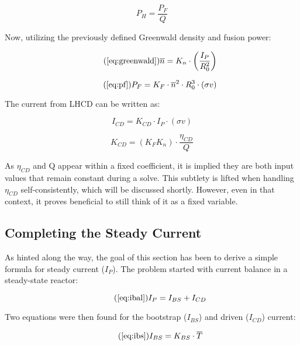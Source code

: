 \documentclass[11pt]{book}
\begin{document}
\begin{equation}
	P_H = \frac{P_F}{Q}
\end{equation}

Now, utilizing the previously defined Greenwald density and fusion power:

 \begin{equation}
 	\tag{\ref{eq:greenwald}}
 	\overline n = K_n \cdot \left( \frac{I_P}{R_0^2} \right)
 \end{equation}
 
 \begin{equation}
	\tag{\ref{eq:pf}}
	P_F = K_F \cdot \overline{n}^2 \cdot R_0^3  \cdot (\sigma v)
\end{equation}

The current from LHCD can be written as:

\begin{equation}
	\label{eq:icd}
	I_{CD} = K_{CD} \cdot I_P \cdot ( \sigma v )
\end{equation}

\begin{equation}
	K_{CD} = \left( K_F K_n \right) \cdot \frac{\eta_{CD}}{Q}
\end{equation}

As $\eta_{CD}$ and Q appear within a fixed coefficient, it is implied they are both input values that remain constant during a solve. This subtlety is lifted when handling $\eta_{CD}$ self-consistently, which will be discussed shortly. However, even in that context, it proves beneficial to still think of it as a fixed variable.

\subsection{Completing the Steady Current}

As hinted along the way, the goal of this section has been to derive a simple formula for steady current ($I_P$). The problem started with current balance in a steady-state reactor:

\begin{equation}
	\tag{\ref{eq:ibal}}
	I_P = I_{BS} + I_{CD}
\end{equation}

Two equations were then found for the bootstrap ($I_{BS}$) and driven ($I_{CD}$) current:

\begin{equation}
	\tag{\ref{eq:ibs}}
	I_{BS} = K_{BS} \cdot \overline T
\end{equation}
\end{document}
